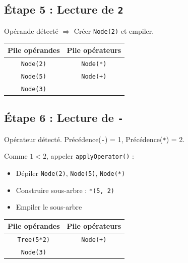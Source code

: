 \documentclass[12pt,a4paper]{article}
\begin{document}
\subsection{Étape 5 : Lecture de \texttt{2}}

Opérande détecté $\Rightarrow$ Créer \texttt{Node(2)} et empiler.

\begin{center}
\begin{tabular}{|c|c|}
\hline
\textbf{Pile opérandes} & \textbf{Pile opérateurs} \\
\hline
\texttt{Node(2)} & \texttt{Node(*)} \\
\texttt{Node(5)} & \texttt{Node(+)} \\
\texttt{Node(3)} & \\
\hline
\end{tabular}
\end{center}

\subsection{Étape 6 : Lecture de \texttt{-}}

Opérateur détecté. Précédence(\texttt{-}) = 1, Précédence(\texttt{*}) = 2.

Comme $1 < 2$, appeler \texttt{applyOperator()} :
\begin{itemize}
    \item Dépiler \texttt{Node(2)}, \texttt{Node(5)}, \texttt{Node(*)}
    \item Construire sous-arbre : \texttt{*(5, 2)}
    \item Empiler le sous-arbre
\end{itemize}

\begin{center}
\end{center}

\begin{center}
\begin{tabular}{|c|c|}
\hline
\textbf{Pile opérandes} & \textbf{Pile opérateurs} \\
\hline
\texttt{Tree(5*2)} & \texttt{Node(+)} \\
\texttt{Node(3)} & \\
\hline
\end{tabular}
\end{center}
\end{document}
